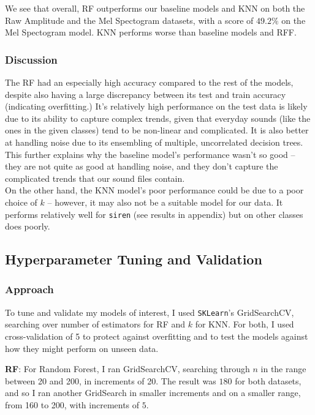 \documentclass[11pt]{article}
\begin{document}
\noindent We see that overall, RF outperforms our baseline models and KNN on both the Raw Amplitude and the Mel Spectogram datasets, with a score of $49.2\%$ on the Mel Spectogram model. KNN performs worse than baseline models and RFF.

\subsubsection{Discussion}
The RF had an especially high accuracy compared to the rest of the models, despite also having a large discrepancy between its test and train accuracy (indicating overfitting.) It's relatively high performance on the test data is likely due to its ability to capture complex trends, given that everyday sounds (like the ones in the given classes) tend to be non-linear and complicated. It is also better at handling noise due to its ensembling of multiple, uncorrelated decision trees. This further explains why the baseline model's performance wasn't so good – they are not quite as good at handling noise, and they don't capture the complicated trends that our sound files contain.\\

\noindent On the other hand, the KNN model's poor performance could be due to a poor choice of $k$ -- however, it may also not be a suitable model for our data. It performs relatively well for \texttt{siren} (see results in appendix) but on other classes does poorly.

\subsection{Hyperparameter Tuning and Validation}

\subsubsection{Approach}

To tune and validate my models of interest, I used \texttt{SKLearn}'s GridSearchCV, searching over number of estimators for RF and $k$ for KNN. For both, I used cross-validation of 5 to protect against overfitting and to test the models against how they might perform on unseen data.

\noindent \textbf{RF}: For Random Forest, I ran GridSearchCV, searching through $n$ in the range between 20 and 200, in increments of 20. The result was $180$ for both datasets, and so I ran another GridSearch in smaller increments and on a smaller range, from 160 to 200, with increments of $5$.\\
\end{document}
